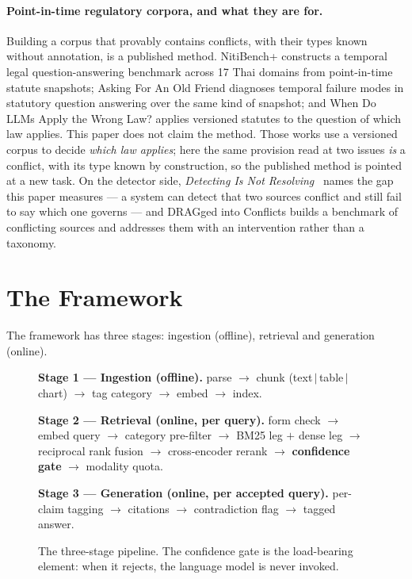 \documentclass[conference]{IEEEtran}
\begin{document}
\paragraph{Point-in-time regulatory corpora, and what they are for.}
Building a corpus that provably contains conflicts, with their types known
without annotation, is a published method. NitiBench+\cite{akarajaradwong2026nitibench}
constructs a temporal legal question-answering benchmark across 17 Thai
domains from point-in-time statute snapshots; Asking For An Old Friend
\cite{prior2026oldfriend} diagnoses temporal failure modes in statutory
question answering over the same kind of snapshot; and When Do LLMs Apply the
Wrong Law?\cite{huang2026wronglaw} applies versioned statutes to the question
of which law applies. This paper does not claim the method. Those works use a
versioned corpus to decide \emph{which law applies}; here the same provision
read at two issues \emph{is} a conflict, with its type known by construction,
so the published method is pointed at a new task. On the detector side,
\emph{Detecting Is Not Resolving}~\cite{yu2026detecting} names the gap this
paper measures --- a system can detect that two sources conflict and still
fail to say which one governs --- and DRAGged into Conflicts
\cite{cattan2025dragged} builds a benchmark of conflicting sources and
addresses them with an intervention rather than a taxonomy.

\section{The Framework}

The framework has three stages: ingestion (offline), retrieval and generation
(online).

\begin{figure}[t]
\centering
\begin{minipage}{0.92\linewidth}
\small
\textbf{Stage 1 --- Ingestion (offline).}
parse $\rightarrow$ chunk (text\,$\vert$\,table\,$\vert$\,chart) $\rightarrow$
tag category $\rightarrow$ embed $\rightarrow$ index.

\textbf{Stage 2 --- Retrieval (online, per query).}
form check $\rightarrow$ embed query $\rightarrow$ category pre-filter
$\rightarrow$ BM25 leg $+$ dense
leg $\rightarrow$ reciprocal rank fusion $\rightarrow$ cross-encoder rerank
$\rightarrow$ \textbf{confidence gate} $\rightarrow$ modality quota.

\textbf{Stage 3 --- Generation (online, per accepted query).}
per-claim tagging $\rightarrow$ citations $\rightarrow$ contradiction flag
$\rightarrow$ tagged answer.
\end{minipage}
\vspace{2pt}
\caption{The three-stage pipeline. The confidence gate is the load-bearing
element: when it rejects, the language model is never invoked.}
\label{fig:pipeline}
\end{figure}
\end{document}
